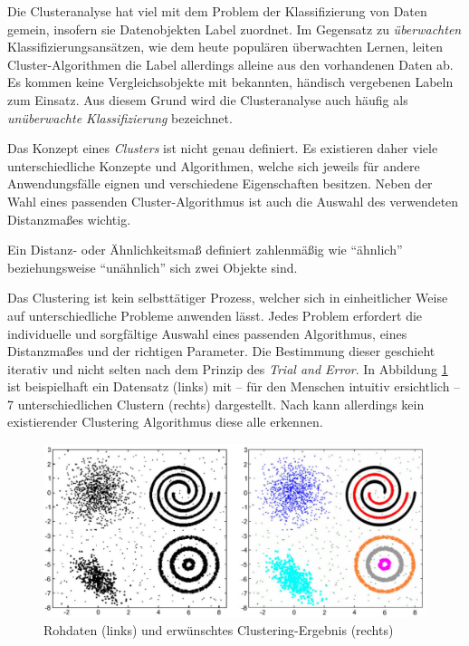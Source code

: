 Die Clusteranalyse hat viel mit dem Problem der Klassifizierung von Daten gemein, insofern sie Datenobjekten
Label zuordnet. Im Gegensatz zu \textit{überwachten} Klassifizierungsansätzen, wie dem heute populären überwachten
Lernen, leiten Cluster-Algorithmen die Label allerdings alleine aus den vorhandenen Daten ab.
Es kommen keine Vergleichsobjekte mit bekannten, händisch vergebenen Labeln zum Einsatz.
Aus diesem Grund wird die Clusteranalyse auch häufig als \textit{unüberwachte Klassifizierung} bezeichnet. \cite[]{tan2007introduction}

Das Konzept eines \textit{Clusters} ist nicht genau definiert. Es existieren daher viele unterschiedliche Konzepte
und Algorithmen, welche sich jeweils für andere Anwendungsfälle eignen und verschiedene Eigenschaften
besitzen. Neben der Wahl eines passenden Cluster-Algorithmus ist auch die Auswahl des verwendeten Distanzmaßes wichtig.

\begin{theorem}[Distanzmaß]
    Ein Distanz- oder Ähnlichkeitsmaß definiert zahlenmäßig wie ``ähnlich'' beziehungsweise ``unähnlich''
    sich zwei Objekte sind.
\end{theorem}

Das Clustering ist kein selbsttätiger Prozess, welcher sich in
einheitlicher Weise auf unterschiedliche Probleme anwenden lässt. Jedes Problem erfordert die individuelle und sorgfältige
Auswahl eines passenden Algorithmus, eines Distanzmaßes und der richtigen Parameter. Die Bestimmung dieser geschieht
iterativ und nicht selten nach dem Prinzip des \textit{Trial and Error}. In Abbildung \ref{fig:grund_clustering_example}
ist beispielhaft ein Datensatz (links) mit -- für den Menschen intuitiv ersichtlich -- 7 unterschiedlichen Clustern (rechts)
dargestellt. Nach \cite[]{Jain2010} kann allerdings kein existierender Clustering Algorithmus diese alle erkennen.
\cite[]{Jain1999, tan2007introduction}

\begin{figure}[H]
    \centering
    \includegraphics[width=0.8\linewidth]{resources/img/grundlagen/clustering_example}
    \caption[Rohdaten und erwünschtes Clustering-Ergebnis]{Rohdaten (links) und erwünschtes Clustering-Ergebnis (rechts) \cite[]{Jain2010}}
    \label{fig:grund_clustering_example}
\end{figure}

